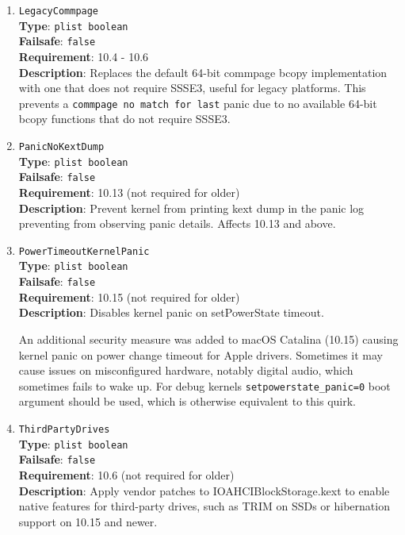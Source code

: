 \documentclass[]{article}
\begin{document}
\begin{enumerate}
\item
  \texttt{LegacyCommpage}\\
  \textbf{Type}: \texttt{plist\ boolean}\\
  \textbf{Failsafe}: \texttt{false}\\
  \textbf{Requirement}: 10.4 - 10.6\\
  \textbf{Description}: Replaces the default 64-bit commpage bcopy implementation with
  one that does not require SSSE3, useful for legacy platforms. This prevents a
  \texttt{commpage no match for last} panic due to no available 64-bit bcopy functions
  that do not require SSSE3.

\item
  \texttt{PanicNoKextDump}\\
  \textbf{Type}: \texttt{plist\ boolean}\\
  \textbf{Failsafe}: \texttt{false}\\
  \textbf{Requirement}: 10.13 (not required for older)\\
  \textbf{Description}: Prevent kernel from printing kext dump in the panic
  log preventing from observing panic details. Affects 10.13 and above.

\item
  \texttt{PowerTimeoutKernelPanic}\\
  \textbf{Type}: \texttt{plist\ boolean}\\
  \textbf{Failsafe}: \texttt{false}\\
  \textbf{Requirement}: 10.15 (not required for older)\\
  \textbf{Description}: Disables kernel panic on setPowerState timeout.

  An additional security measure was added to macOS Catalina (10.15) causing
  kernel panic on power change timeout for Apple drivers. Sometimes it may cause
  issues on misconfigured hardware, notably digital audio, which sometimes fails
  to wake up. For debug kernels \texttt{setpowerstate\_panic=0} boot argument
  should be used, which is otherwise equivalent to this quirk.

\item
  \texttt{ThirdPartyDrives}\\
  \textbf{Type}: \texttt{plist\ boolean}\\
  \textbf{Failsafe}: \texttt{false}\\
  \textbf{Requirement}: 10.6 (not required for older)\\
  \textbf{Description}: Apply vendor patches to IOAHCIBlockStorage.kext to enable
  native features for third-party drives, such as TRIM on SSDs or hibernation
  support on 10.15 and newer.


\end{enumerate}
\end{document}
